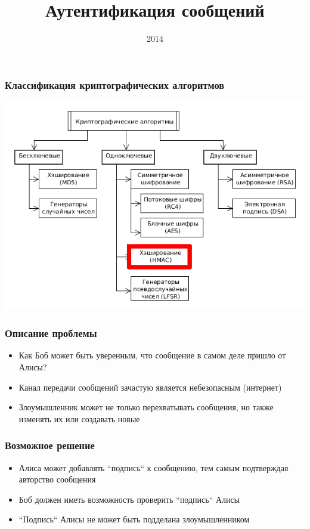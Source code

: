 \documentclass{beamer}
\title{Аутентификация сообщений}
\institute{ВГУ}
\date{2014}
\begin{document}
\frame{\titlepage}

\begin{frame}
  \frametitle{Классификация криптографических алгоритмов}

  \includegraphics[width=\linewidth]{./images/png/CA_classification_hash.png}

\end{frame}

\begin{frame}
  \frametitle{Описание проблемы}

  \begin{itemize}
    \item{Как Боб может быть уверенным, что сообщение в самом деле пришло от Алисы?}
    \item{Канал передачи сообщений зачастую является небезопасным (интернет)}
    \item{Злоумышленник может не только перехватывать сообщения, но также изменять их или создавать новые}
  \end{itemize}
\end{frame}

\begin{frame}
  \frametitle{Возможное решение}

  \begin{itemize}
    \item{Алиса может добавлять ``подпись`` к сообщению, тем самым подтверждая авторство сообщения}
    \item{Боб должен иметь возможность проверить ``подпись`` Алисы}
    \item{``Подпись`` Алисы не может быть подделана злоумышленником}
  \end{itemize}
\end{frame}
\end{document}
